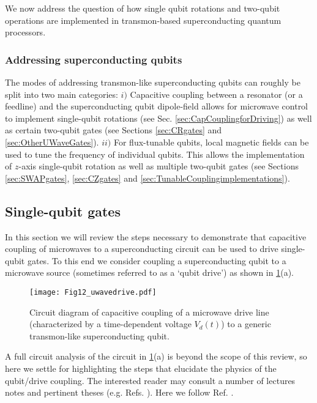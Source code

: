 \documentclass[aip,apr,twocolumn,showpacs,superscriptaddress,groupedaddress,nofootinbib,reprint]{revtex4-1}  %
\begin{document}
We now address the question of how single qubit rotations and two-qubit operations are implemented in transmon-based superconducting quantum processors.


\subsubsection{\label{sec:SingleQubitGatesMW}Addressing superconducting qubits}
The modes of addressing transmon-like superconducting qubits can roughly be split into two main categories: $i)$ Capacitive coupling between a resonator (or a feedline) and the superconducting qubit dipole-field allows for microwave control to implement single-qubit rotations (see Sec. \ref{sec:CapCouplingforDriving}) as well as certain two-qubit gates (see Sections \ref{sec:CRgates} and \ref{sec:OtherUWaveGates}). $ii)$ For flux-tunable qubits, local magnetic fields can be used to tune the frequency of individual qubits. This allows the implementation of $z$-axis single-qubit rotation as well as multiple two-qubit gates (see Sections \ref{sec:SWAPgates}, \ref{sec:CZgates} and \ref{sec:TunableCouplingimplementations}).


\subsection{\label{sec:CapCouplingforDriving}Single-qubit gates}
In this section we will review the steps necessary to demonstrate that capacitive coupling of microwaves to a superconducting circuit can be used to drive single-qubit gates. To this end we consider coupling a superconducting qubit to a microwave source (sometimes referred to as a `qubit drive') as shown in \cref{fig:capacitivecoupling}(a).
\begin{figure}[!t]
\centering
\texttt{[image: Fig12\_uwavedrive.pdf]}
\caption{Circuit diagram of capacitive coupling of a microwave drive line (characterized by a time-dependent voltage $V_d(t)$) to a generic transmon-like superconducting qubit.}
\label{fig:capacitivecoupling}
\end{figure}
A full circuit analysis of the circuit in \cref{fig:capacitivecoupling}(a) is beyond the scope of this review, so here we settle for highlighting the steps that elucidate the physics of the qubit/drive coupling. The interested reader may consult a number of lectures notes and pertinent theses (e.g. Refs. ). Here we follow Ref. .
\end{document}
